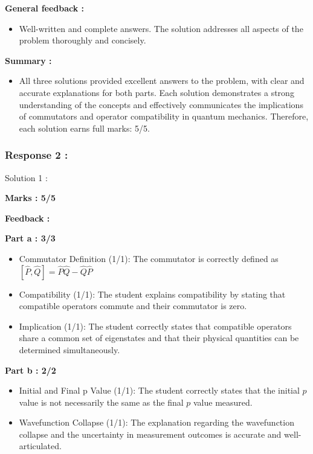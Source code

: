 \documentclass[a4paper,11pt]{article}
\begin{document}
\textbf{General feedback :}

\begin{itemize}
    \item Well-written and complete answers. The solution addresses all aspects of the problem thoroughly and concisely.
\end{itemize}


\textbf{Summary :}

\begin{itemize}
    \item All three solutions provided excellent answers to the problem, with clear and accurate explanations for both parts. Each solution demonstrates a strong understanding of the concepts and effectively communicates the implications of commutators and operator compatibility in quantum mechanics. Therefore, each solution earns full marks: 5/5.
\end{itemize}


\subsubsection*{Response 2 :} 

Solution 1 :

\textbf{Marks : 5/5}

\textbf{Feedback : }

\textbf{Part a : 3/3}

\begin{itemize}
    \item Commutator Definition (1/1): The commutator is correctly defined as $[\hat{P},\hat{Q}] = \hat{P}\hat{Q} - \hat{Q}\hat{P}$
    \item Compatibility (1/1): The student explains compatibility by stating that compatible operators commute and their commutator is zero.
    \item Implication (1/1): The student correctly states that compatible operators share a common set of eigenstates and that their physical quantities can be determined simultaneously.
\end{itemize}

\textbf{Part b : 2/2}

\begin{itemize}
    \item Initial and Final p Value (1/1): The student correctly states that the initial $p$ value is not necessarily the same as the final $p$ value measured.
    \item Wavefunction Collapse (1/1): The explanation regarding the wavefunction collapse and the uncertainty in measurement outcomes is accurate and well-articulated.
\end{itemize}
\end{document}
